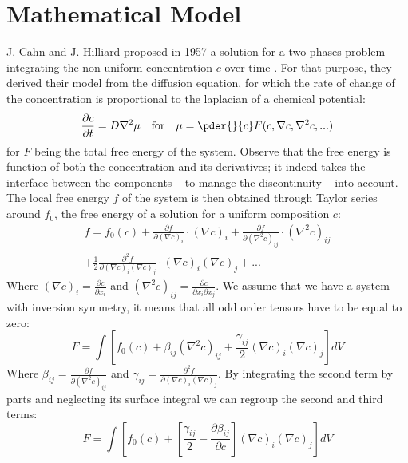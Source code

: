 \documentclass[10pt,a4paper,twocolumn]{article}
\begin{document}
\section{Mathematical Model} %
\label{sec:mathematical_model}

J. Cahn and J. Hilliard proposed in 1957 a solution for a two-phases problem integrating the non-uniform concentration $c$ over time \cite{cahn_hilliard}. For that purpose, they derived their model from the diffusion equation, for which the rate of change of the concentration is proportional to the laplacian of a chemical potential:
\begin{equation}
    \frac{\partial c}{\partial t} = D{\nabla^2} \mu \quad\text{for}\quad \mu = \pder{}{c}F(c,\nabla c, \nabla^2 c, ...)
    \label{eq:diffusion}
\end{equation}
for $F$ being the total free energy of the system.
Observe that the free energy is function of both the concentration and its derivatives; it indeed takes the interface between the components -- to manage the discontinuity -- into account. The local free energy $f$ of the system is then obtained through Taylor series around $f_0$, the free energy of a solution for a uniform composition $c$:
\begin{multline}
    f = f_0(c) + \frac{\partial f}{\partial (\nabla c)_i} \cdot (\nabla c)_i + \frac{\partial f}{\partial (\nabla^2 c)_{ij}} \cdot (\nabla^2 c)_{ij} \\+ \frac{1}{2} \frac{\partial^2 f}{\partial (\nabla c)_i(\nabla c)_j} \cdot (\nabla c)_i(\nabla c)_j + ...
\end{multline}
Where $(\nabla c)_i = \frac{\partial c}{\partial x_i}$ and $(\nabla^2 c)_{ij} = \frac{\partial c}{\partial x_i\partial x_j}$.
We assume that we have a system with inversion symmetry, it means that all odd order tensors have to be equal to zero:
\begin{equation}
    F = \int [ f_0(c) + \beta_{ij}(\nabla^2 c)_{ij} + \frac{\gamma_{ij}}{2} (\nabla c)_i(\nabla c)_j] dV
\end{equation}
Where $ \beta_{ij} = \frac{\partial f}{\partial (\nabla^2 c)_{ij}} $ and $\gamma_{ij} = \frac{\partial^2 f}{\partial (\nabla c)_i(\nabla c)_j} $.
By integrating the second term by parts and neglecting its surface integral we can regroup the second and third terms:
\begin{equation}
    F = \int  [f_0(c) + [\frac{\gamma_{ij}}{2} - \frac{\partial \beta_{ij}}{\partial c}](\nabla c)_i(\nabla c)_j]dV
\end{equation}
\end{document}
